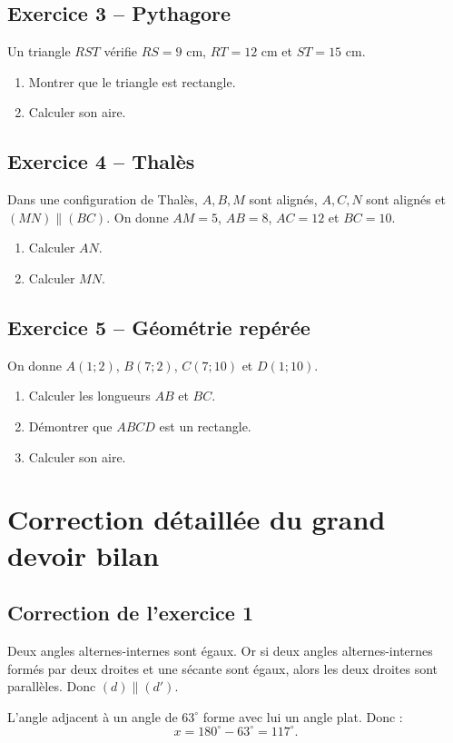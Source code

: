 \documentclass[11pt,a4paper]{article}
\newcounter{exercice}
\begin{document}
\subsection*{Exercice 3 -- Pythagore}
Un triangle $RST$ vérifie $RS=9$ cm, $RT=12$ cm et $ST=15$ cm.
\begin{enumerate}
\item Montrer que le triangle est rectangle.
\item Calculer son aire.
\end{enumerate}

\subsection*{Exercice 4 -- Thalès}
Dans une configuration de Thalès, $A,B,M$ sont alignés, $A,C,N$ sont alignés et $(MN)\parallel(BC)$. On donne $AM=5$, $AB=8$, $AC=12$ et $BC=10$.
\begin{enumerate}
\item Calculer $AN$.
\item Calculer $MN$.
\end{enumerate}

\subsection*{Exercice 5 -- Géométrie repérée}
On donne $A(1;2)$, $B(7;2)$, $C(7;10)$ et $D(1;10)$.
\begin{enumerate}
\item Calculer les longueurs $AB$ et $BC$.
\item Démontrer que $ABCD$ est un rectangle.
\item Calculer son aire.
\end{enumerate}

\clearpage
\section{Correction détaillée du grand devoir bilan}

\subsection*{Correction de l'exercice 1}
Deux angles alternes-internes sont égaux. Or si deux angles alternes-internes formés par deux droites et une sécante sont égaux, alors les deux droites sont parallèles. Donc $(d)\parallel(d')$.

L'angle adjacent à un angle de $63^\circ$ forme avec lui un angle plat. Donc :
\[
x=180^\circ-63^\circ=117^\circ.
\]
\end{document}
